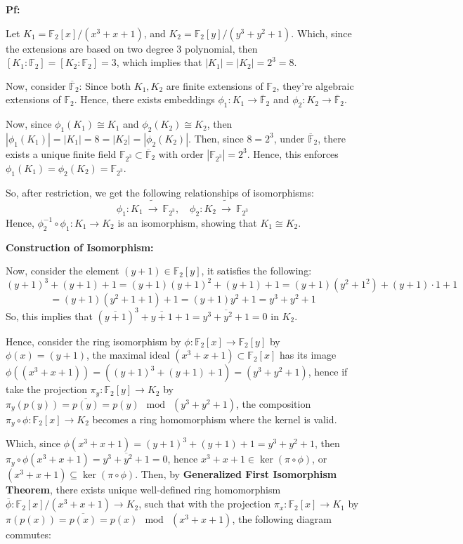 \documentclass{article}
\begin{document}
\textbf{Pf:}

Let $K_1=\mathbb{F}_2[x]/(x^3+x+1)$, and $K_2=\mathbb{F}_2[y]/(y^3+y^2+1)$. Which, since the extensions are based on two degree $3$ polynomial, then $[K_1:\mathbb{F}_2]=[K_2:\mathbb{F}_2]=3$, which implies that $|K_1| = |K_2| = 2^3=8$.

Now, consider $\overline{\mathbb{F}}_2$: Since both $K_1,K_2$ are finite extensions of $\mathbb{F}_2$, they're algebraic extensions of $\mathbb{F}_2$. Hence, there exists embeddings $\phi_1:K_1\rightarrow \overline{\mathbb{F}}_2$ and $\phi_2:K_2\rightarrow\overline{\mathbb{F}}_2$.

Now, since $\phi_1(K_1)\cong K_1$ and $\phi_2(K_2)\cong K_2$, then $|\phi_1(K_1)|=|K_1|=8=|K_2|=|\phi_2(K_2)|$. Then, since $8=2^3$, under $\overline{\mathbb{F}}_2$, there exists a unique finite field $\mathbb{F}_{2^3}\subset\overline{\mathbb{F}}_2$ with order $|\mathbb{F}_{2^3}|=2^3$. Hence, this enforces $\phi_1(K_1)=\phi_2(K_2)=\mathbb{F}_{2^3}$.

So, after restriction, we get the following relationships of isomorphisms:
$$\phi_1:K_1\ \tilde{\rightarrow}\ \mathbb{F}_{2^3},\quad \phi_2:K_2\ \tilde{\rightarrow}\ \mathbb{F}_{2^3}$$
Hence, $\phi_2^{-1}\circ \phi_1:K_1\rightarrow K_2$ is an isomorphism, showing that $K_1\cong K_2$.

\hfil

\textbf{Construction of Isomorphism:}

Now, consider the element $(y+1)\in \mathbb{F}_2[y]$, it satisfies the following:
$$(y+1)^3+(y+1)+1 = (y+1)(y+1)^2+(y+1)+1 = (y+1)(y^2+1^2)+(y+1)\cdot 1+1$$
$$ = (y+1)(y^2+1+1)+1 = (y+1)y^2 + 1 = y^3+y^2+1$$
So, this implies that $(\overline{y+1})^3+\overline{y+1}+1 = \overline{y^3+y^2+1}= 0$ in $K_2$.

Hence, consider the ring isomorphism by $\phi:\mathbb{F}_2[x]\rightarrow\mathbb{F}_2[y]$ by $\phi(x)=(y+1)$, the maximal ideal $(x^3+x+1)\subset \mathbb{F}_2[x]$ has its image $\phi((x^3+x+1)) = ((y+1)^3+(y+1)+1) = (y^3+y^2+1)$, hence if take the projection $\pi_y:\mathbb{F}_2[y]\rightarrow K_2$ by $\pi_y(p(y))=\overline{p(y)}=p(y)\mod\ (y^3+y^2+1)$, the composition $\pi_y\circ\phi:\mathbb{F}_2[x]\rightarrow K_2$ becomes a ring homomorphism where the kernel is valid.

Which, since $\phi(x^3+x+1)=(y+1)^3+(y+1)+1 = y^3+y^2+1$, then $\pi_y\circ\phi(x^3+x+1)=\overline{y^3+y^2+1}=0$, hence $x^3+x+1\in \ker(\pi\circ\phi)$, or $(x^3+x+1)\subseteq \ker(\pi\circ\phi)$. Then, by \textbf{Generalized First Isomorphism Theorem}, there exists unique well-defined ring homomorphism $\overline{\phi}:\mathbb{F}_2[x]/(x^3+x+1)\rightarrow K_2$, such that with the projection $\pi_x:\mathbb{F}_2[x]\rightarrow K_1$ by $\pi(p(x))=\overline{p(x)}=p(x)\mod\ (x^3+x+1)$, the following diagram commutes:
\end{document}
